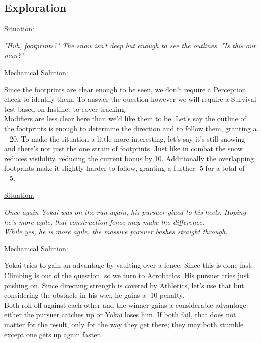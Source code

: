 \pagebreak
\begin{multicols}{2}
	\subsection*{Exploration}
	\ul{Situation:}
	\begin{exampleblock}
		\textit{"Huh, footprints?" The snow isn't deep but enough to see the outlines. "Is this our man?"}
	\end{exampleblock}
	\ul{Mechanical Solution:}
	\begin{exampleblock}
		Since the footprints are clear enough to be seen, we don't require a Perception check to identify them. To answer the question however we will require a Survival test based on Instinct to cover tracking.\\
		Modifiers are less clear here than we'd like them to be. Let's say the outline of the footprints is enough to determine the direction and to follow them, granting a +20. To make the situation a little more interesting, let's say it's still snowing and there's not just the one strain of footprints. Just like in combat the snow reduces visibility, reducing the current bonus by 10. Additionally the overlapping footprints make it slightly harder to follow, granting a further -5 for a total of +5.
	\end{exampleblock}
	\columnbreak
	\ul{Situation:}
	\begin{exampleblock}
		\textit{Once again Yokai was on the run again, his pursuer glued to his heels. Hoping he's more agile, that construction fence may make the difference.\\
			While yes, he is more agile, the massive pursuer bashes straight through.}
	\end{exampleblock}
	\ul{Mechanical Solution:}
	\begin{exampleblock}
		Yokai tries to gain an advantage by vaulting over a fence. Since this is done fast, Climbing is out of the question, so we turn to Acrobatics. His pursuer tries just pushing on. Since directing strength is covered by Athletics, let's use that but considering the obstacle in his way, he gains a -10 penalty.\\
		Both roll off against each other and the winner gains a considerable advantage: either the pursuer catches up or Yokai loses him. If both fail, that does not matter for the result, only for the way they get there; they may both stumble except one gets up again faster.
	\end{exampleblock}
\end{multicols}

